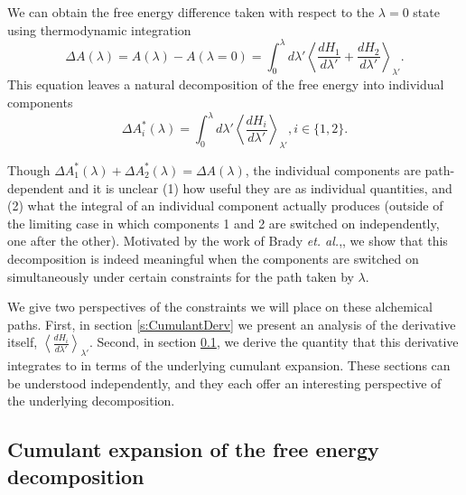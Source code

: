 \documentclass[%
 preprint,
 amsmath,amssymb,
 aps,
]{revtex4-1}
\begin{document}
We can obtain the free energy difference taken with respect to the $\lambda=0$ state using thermodynamic integration\cite{NULL}
\begin{equation}
\Delta A (\lambda)= A(\lambda)-A(\lambda=0)  = \int_0^{\lambda} d \lambda'
\left\langle \frac{dH_1}{d \lambda'} +  \frac{dH_2}{d \lambda'}  \right \rangle_{\lambda'}.
\label{e:TI}
\end{equation}
This equation leaves a natural decomposition of the free energy into individual components
\begin{equation}
\Delta A^*_i  (\lambda) = \int_0^{\lambda} d \lambda' 
\left\langle \frac{dH_i}{d \lambda'} \right \rangle_{\lambda'}, i \in \{ 1,2 \}.
\label{e:TIcomps}
\end{equation}
 
Though $\Delta A^*_1  (\lambda)+ \Delta A^*_2  (\lambda)= \Delta A (\lambda)$, the individual components are path-dependent and it is unclear (1) how useful they are as individual quantities, and (2) what the integral of an individual component actually produces (outside of the limiting case in which components 1 and 2 are switched on independently, one after the other).  Motivated by the work of Brady \emph{et. al.},\cite{NULL}, we show that this decomposition is indeed meaningful when the components are switched on simultaneously under certain constraints for the path taken by $\lambda$.

We give two perspectives of the constraints we will place on these alchemical paths.  First, in section \ref{s:CumulantDerv} we present an analysis of the derivative itself, 
$\left\langle \frac{dH_i}{d \lambda'} \right \rangle_{\lambda'}$.  Second, in section \ref{s:CumultantInt}, we derive the quantity that this derivative integrates to in terms of the underlying cumulant expansion.  These sections can be understood independently, and they each offer an interesting perspective of the underlying decomposition. 

\subsection{Cumulant expansion of the free energy decomposition}
\label{s:CumultantInt}
\end{document}
